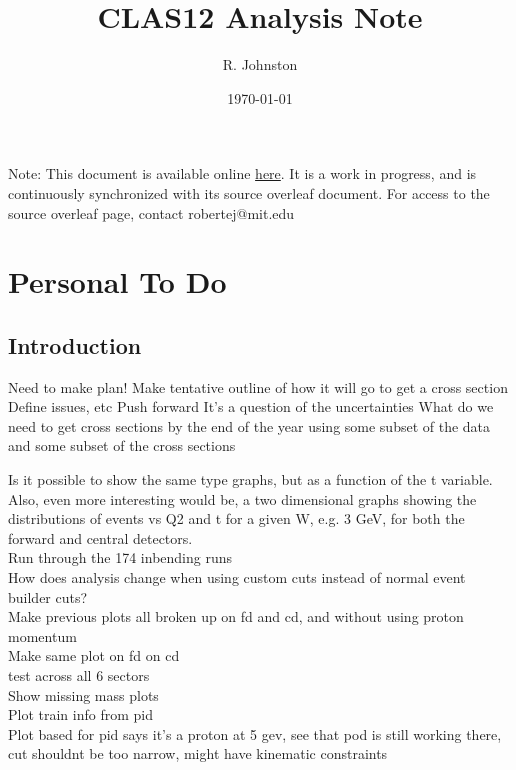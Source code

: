 \documentclass[oneside]{book}
\title{CLAS12 \DVEP Analysis Note}
\author{R. Johnston}
\date{\today}
\begin{document}
\maketitle
Note: This document is available online \href{https://latexonline.cc/compile?git=https\%3A\%2F\%2Fgithub.com\%2Frobertej19\%2FClas12AnaNote&target=main.tex&command=pdflatex\&trackId=1593973491329}{here}. It is a work in progress, and is continuously synchronized with its source overleaf document. For access to the source overleaf page, contact robertej@mit.edu

\chapter{Personal To Do}

\section{Introduction}
Need to make plan!
Make tentative outline of how it will go to get a cross section
Define issues, etc
Push forward
It’s a question of the uncertainties 
What do we need to get cross sections by the end of the year using some subset of the data and some subset of the cross sections

Is it possible to show the same type graphs, but as a function of the t variable. Also, even more interesting would be, a two dimensional graphs  showing the distributions of events vs Q2 and t  for a given W, e.g. 3 GeV, for both the forward and central detectors.\\

Run through the 174 inbending runs\\

How does analysis change when using custom cuts instead of normal event builder cuts?\\


Make previous plots all broken up on fd and cd, and without using proton momentum\\

Make same plot on fd on cd \\
test across all 6 sectors\\
Show missing mass plots\\
Plot train info from pid\\

Plot based for pid says it's a proton at 5 gev, see that pod is still working there, cut shouldnt be too narrow, might have kinematic constraints\\
\end{document}
